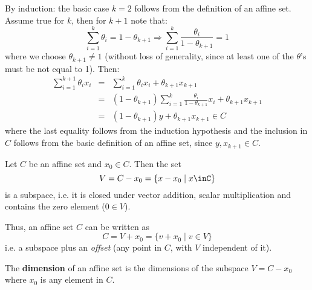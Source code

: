 \begin{Proof}
  By induction: the basic case $k=2$ follows from the definition of an affine
  set. Assume true for $k$, then for $k+1$ note that:
  \begin{equation*}
    \sum_{i=1}^k\theta_i = 1-\theta_{k+1}\Rightarrow
    \sum_{i=1}^k\frac{\theta_i}{1-\theta_{k+1}} = 1
  \end{equation*}
  where we choose $\theta_{k+1}\ne 1$ (without loss of generality, since at
  least one of the $\theta$'s must be not equal to 1). Then:
  \begin{equation*}
    \begin{array}{rcl}
      \sum_{i=1}^{k+1}\theta_ix_i & = &
                                        \sum_{i=1}^{k}\theta_ix_i+\theta_{k+1}x_{k+1}
      \\
                                  & = &
                                        (1-\theta_{k+1})\sum_{i=1}^k\frac{\theta_i}{1-\theta_{k+1}}x_i+\theta_{k+1}x_{k+1}
      \\
                                  & = & (1-\theta_{k+1})y+\theta_{k+1}x_{k+1} \in C
    \end{array}
  \end{equation*}
  where the last equality follows from the induction hypothesis and the
  inclusion in $C$ follows from the basic definition of an affine set, since $y,
  x_{k+1}\in C$. \QED
\end{Proof}

\begin{Fact}
  Let $C$ be an affine set and $x_0\in C$. Then the set
  \begin{equation*}
    V = C-x_0 = \{ x-x_0 \mid x\inC \}
  \end{equation*}
  is a subspace, i.e. it is closed under vector addition, scalar multiplication
  and contains the zero element ($0\in V$).

  Thus, an affine set $C$ can be written as
  \begin{equation*}
    C = V+x_0 = \{v+x_0 \mid v\in V\}
  \end{equation*}
  i.e. a subspace plus an \textit{offset} (any point in $C$, with $V$
  independent of it).
\end{Fact}

\begin{Definition}
  The \textbf{dimension} of an affine set is the dimensions of the subspace
  $V=C-x_0$ where $x_0$ is any element in $C$.
\end{Definition}

